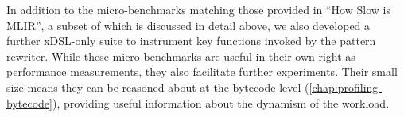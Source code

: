 In addition to the micro-benchmarks matching those provided in ``How Slow is MLIR'', a subset of which is discussed in detail above, we also developed a further xDSL-only suite to instrument key functions invoked by the pattern rewriter.
While these micro-benchmarks are useful in their own right as performance measurements, they also facilitate further experiments. Their small size means they can be reasoned about at the bytecode level (\autoref{chap:profiling-bytecode}), providing useful information about the dynamism of the workload.






















